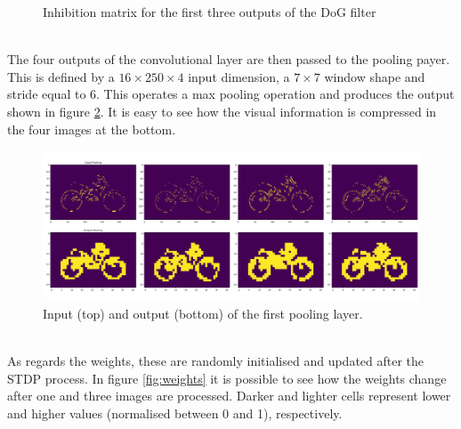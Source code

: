 \documentclass[11pt,a4paper]{scrartcl}
\begin{document}
\begin{figure}[!h]
\begin{minipage}[b]{0.32\textwidth}
	\end{minipage}
	\caption{Inhibition matrix for the first three outputs of the DoG filter}
	\label{fig:k}
\end{figure}\\
The four outputs of the convolutional layer are then passed to the pooling payer. This is defined by a $ 16\times250\times4 $ input dimension, a $ 7\times7 $ window shape and stride equal to $ 6 $. This operates a max pooling operation and produces the output shown in figure \ref{fig:pool}. It is easy to see how the visual information is compressed in the four images at the bottom.
\begin{figure}[!h]
	\centering
	\includegraphics[width=\textwidth]{images/pool_slice1}
	\caption{Input (top) and output (bottom) of the first pooling layer.}
	\label{fig:pool}
\end{figure}\\
As regards the weights, these are randomly initialised and updated after the STDP process. In figure \ref{fig:weights} it is possible to see how the weights change after one and three images are processed. Darker and lighter cells represent lower and higher values (normalised between 0 and 1), respectively.
\end{document}
